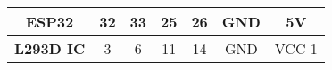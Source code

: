 \begin{tabular}{ |c| c| c| c| c|c|c|}
    \hline
    \textbf{ESP32} & 32 & 33 & 25 & 26  & GND & 5V\\ 
    \hline
    \textbf{L293D IC} & 3 & 6 & 11 & 14 & GND & VCC 1\\ 
    \hline
    \end{tabular}
